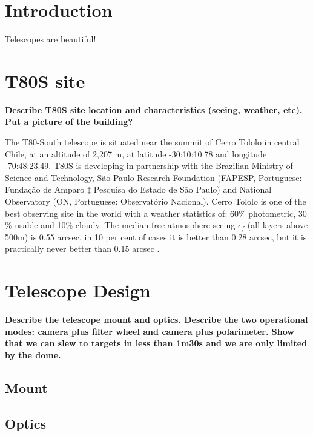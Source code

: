 \documentclass[12pt,preprint]{aastex}
\begin{document}


\section{Introduction}

Telescopes are beautiful! \citep{Benitez.etal.2014a}


\section{T80S site}

{\bf \color{red} Describe T80S site location and characteristics (seeing, weather, etc). Put a picture of the building?}

The T80-South telescope is situated near the summit of Cerro Tololo in central Chile, at an altitude of 2,207 m, at latitude -30:10:10.78 and longitude -70:48:23.49. T80S  is
developing in partnership with the Brazilian Ministry of Science and Technology, São Paulo Research Foundation (FAPESP, Portuguese: Funda\c c\~ao de Amparo ‡ Pesquisa do Estado de S\~ao Paulo) and National Observatory (ON, Portuguese: Observat\'orio Nacional). Cerro Tololo is one of the best observing site in the world with a weather statistics of: 60$\%$ photometric, 30$\%$ usable and 10$\%$ cloudy. The median free-atmosphere seeing $\epsilon_f$ (all layers above 500m) is 0.55 arcsec, in 10 per cent of cases it is better than 0.28
arcsec, but it is practically never better than 0.15 arcsec \citep{Tokovinin.Baumont.Vasquez.2003a}.


\section{Telescope Design}
{\bf \color{red} Describe the telescope mount and optics. Describe the two operational modes: camera plus filter wheel and camera plus polarimeter. Show that we can slew to targets in less than 1m30s and we are only limited by the dome.}

\subsection{Mount}

\subsection{Optics}
\end{document}
